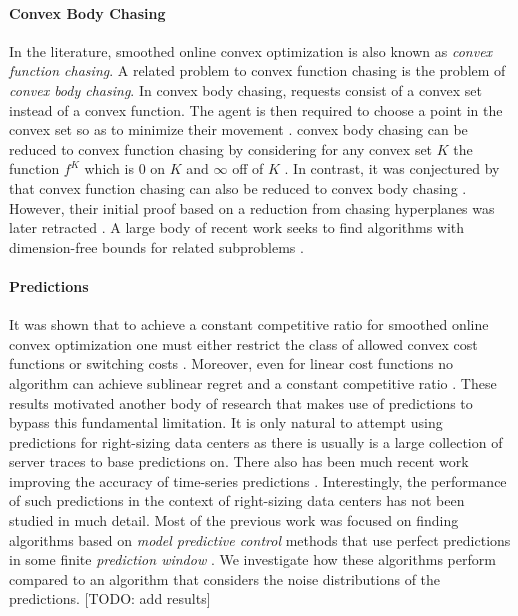 \paragraph{Convex Body Chasing} In the literature, smoothed online convex optimization is also known as \textit{convex function chasing}. A related problem to convex function chasing is the problem of \textit{convex body chasing}. In convex body chasing, requests consist of a convex set instead of a convex function. The agent is then required to choose a point in the convex set so as to minimize their movement \cite{Antoniadis2016}. convex body chasing can be reduced to convex function chasing by considering for any convex set $K$ the function $f^K$ which is 0 on $K$ and $\infty$ off of $K$ \cite{Sellke2019}. In contrast, it was conjectured by \citeauthor*{Antoniadis2016} that convex function chasing can also be reduced to convex body chasing \cite{Antoniadis2016}. However, their initial proof based on a reduction from chasing hyperplanes was later retracted \cite{Pruhs2021}. A large body of recent work seeks to find algorithms with dimension-free bounds for related subproblems \cite{Bubeck2018, Bubeck2018_2, Argue2019, Argue2020}.

\paragraph{Predictions} It was shown that to achieve a constant competitive ratio for smoothed online convex optimization one must either restrict the class of allowed convex cost functions or switching costs \cite{Chen2018}. Moreover, even for linear cost functions no algorithm can achieve sublinear regret and a constant competitive ratio \cite{Andrew2015}. These results motivated another body of research that makes use of predictions to bypass this fundamental limitation. It is only natural to attempt using predictions for right-sizing data centers as there is usually is a large collection of server traces to base predictions on. There also has been much recent work improving the accuracy of time-series predictions \cite{Taylor2017, Benidis2020, Chen2020, Hosseini2021}. Interestingly, the performance of such predictions in the context of right-sizing data centers has not been studied in much detail. Most of the previous work was focused on finding algorithms based on \textit{model predictive control} methods that use perfect predictions in some finite \textit{prediction window} \cite{Lin2012, Chen2015, Badiei2015, Chen2016, Li2018, Lin2019}. We investigate how these algorithms perform compared to an algorithm that considers the noise distributions of the predictions. [TODO: add results]

